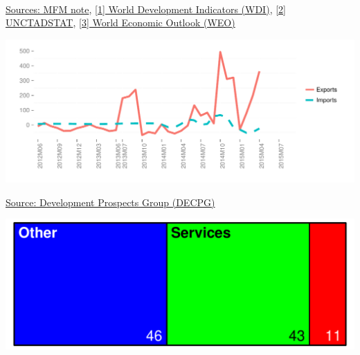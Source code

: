 \documentclass{article}\usepackage[]{graphicx}\usepackage[]{color}
\makeatletter
\def\maxwidth{ %
  \ifdim\Gin@nat@width>\linewidth
    \linewidth
  \else
    \Gin@nat@width
  \fi
}
\makeatother
\begin{document}
\begin{minipage}[b]{0.99\textwidth}
\begin{minipage}[t]{0.99\textwidth}
\begin{minipage}[c]{0.11\textwidth}
      \vspace*{-0.4cm}
    \end{minipage}
  \\[3pt]
\raggedright{\footnotesize{\href{http://www.worldbank.org/en/topic/macroeconomics/overview}{Sources: MFM note}{,} \href{http://data.worldbank.org/data-catalog/world-development indicators}{[1] World Development Indicators (WDI)}{,} \href{http://unctadstat.unctad.org/wds/ReportFolders/reportFolders.aspx}{[2] UNCTADSTAT}{,} \href{https://www.imf.org/external/pubs/ft/weo/2015/02/weodata/index.aspx}{[3] World Economic Outlook (WEO)}}}
  \end{minipage} 
  \begin{minipage}[b]{\textwidth} %
  \vspace{+3ex}
    \begin{minipage}[c]{0.49\textwidth} %


{\centering \includegraphics[width=\maxwidth]{figure/ExpImp_HF-1} 

}



    \vspace*{-0.3cm}
    \raggedright{\footnotesize{\href{http://web.worldbank.org/WBSITE/EXTERNAL/EXTDEC/EXTDECPROSPECTS/0,,menuPK:476941~pagePK:51084723~piPK:51084722~theSitePK:476883,00.html}{Source: Development Prospects Group (DECPG)}}}
    \end{minipage}
    \begin{minipage}[c]{0.49\textwidth} %


{\centering \includegraphics[width=\maxwidth]{figure/GVA_Treemap-1} 

}
\end{minipage}
\end{minipage}
\end{minipage}
\end{document}
